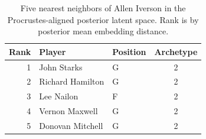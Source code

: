 \begin{table}[htbp]
  \centering\small
  \begin{tabular}{rllc}
    \toprule
    Rank & Player & Position & Archetype \\
    \midrule
    1 & John Starks & G & 2 \\
    2 & Richard Hamilton & G & 2 \\
    3 & Lee Nailon & F & 2 \\
    4 & Vernon Maxwell & G & 2 \\
    5 & Donovan Mitchell & G & 2 \\
    \bottomrule
  \end{tabular}
  \caption{Five nearest neighbors of Allen Iverson in the Procrustes-aligned posterior latent space. Rank is by posterior mean embedding distance.}
  \label{tab:Allen_Iverson_neighbors}
\end{table}

